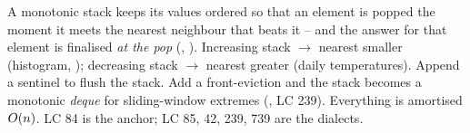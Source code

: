 \begin{recallbox}
A monotonic stack keeps its values ordered so that an element is popped the moment it meets the nearest
neighbour that beats it -- and the answer for that element is finalised \emph{at the pop}
(, ). Increasing stack $\to$ nearest smaller (histogram,
); decreasing stack $\to$ nearest greater (daily temperatures). Append a sentinel to
flush the stack. Add a front-eviction and the stack becomes a monotonic \emph{deque} for sliding-window
extremes (, LC 239). Everything is amortised $O(n)$. LC 84 is the anchor; LC 85,
42, 239, 739 are the dialects.
\end{recallbox}
